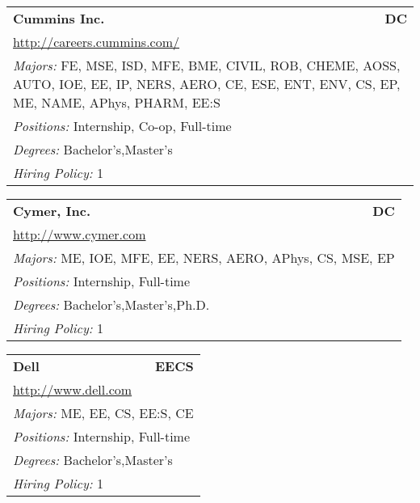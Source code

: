 \documentclass[twoside]{article}
\begin{document}
\begin{center}
\begin{multicols}{3}
\begin{FlushLeft}
\begin{minipage}{\columnwidth}
\end{minipage}
 
\begin{minipage}{\columnwidth}\begin{tabularx}{.95\columnwidth}{Xr}
                 {\Large\bf Cummins Inc.} & {\Large\bf DC}\\
    \multicolumn{2}{p{.95\columnwidth}}{\url{http://careers.cummins.com/}}\\
    \multicolumn{2}{p{.95\columnwidth}}{\emph{Majors:} FE, MSE, ISD, MFE, BME, CIVIL, ROB, CHEME, AOSS, AUTO, IOE, EE, IP, NERS, AERO, CE, ESE, ENT, ENV, CS, EP, ME, NAME, APhys, PHARM, EE:S}\\
    \multicolumn{2}{p{.95\columnwidth}}{\emph{Positions:} Internship, Co-op, Full-time}\\
    \multicolumn{2}{p{.95\columnwidth}}{\emph{Degrees:} Bachelor's,Master's}\\
    \multicolumn{2}{p{.95\columnwidth}}{\emph{Hiring Policy:} 1}\\
    \end{tabularx}
    
\end{minipage}
 
\begin{minipage}{\columnwidth}\begin{tabularx}{.95\columnwidth}{Xr}
                 {\Large\bf Cymer, Inc.} & {\Large\bf DC}\\
    \multicolumn{2}{p{.95\columnwidth}}{\url{http://www.cymer.com}}\\
    \multicolumn{2}{p{.95\columnwidth}}{\emph{Majors:} ME, IOE, MFE, EE, NERS, AERO, APhys, CS, MSE, EP}\\
    \multicolumn{2}{p{.95\columnwidth}}{\emph{Positions:} Internship, Full-time}\\
    \multicolumn{2}{p{.95\columnwidth}}{\emph{Degrees:} Bachelor's,Master's,Ph.D.}\\
    \multicolumn{2}{p{.95\columnwidth}}{\emph{Hiring Policy:} 1}\\
    \end{tabularx}
    
\end{minipage}
 
\begin{minipage}{\columnwidth}\begin{tabularx}{.95\columnwidth}{Xr}
                 {\Large\bf Dell} & {\Large\bf EECS}\\
    \multicolumn{2}{p{.95\columnwidth}}{\url{http://www.dell.com}}\\
    \multicolumn{2}{p{.95\columnwidth}}{\emph{Majors:} ME, EE, CS, EE:S, CE}\\
    \multicolumn{2}{p{.95\columnwidth}}{\emph{Positions:} Internship, Full-time}\\
    \multicolumn{2}{p{.95\columnwidth}}{\emph{Degrees:} Bachelor's,Master's}\\
    \multicolumn{2}{p{.95\columnwidth}}{\emph{Hiring Policy:} 1}\\
    \end{tabularx}
    

\end{minipage}
\end{FlushLeft}
\end{multicols}
\end{center}
\end{document}
